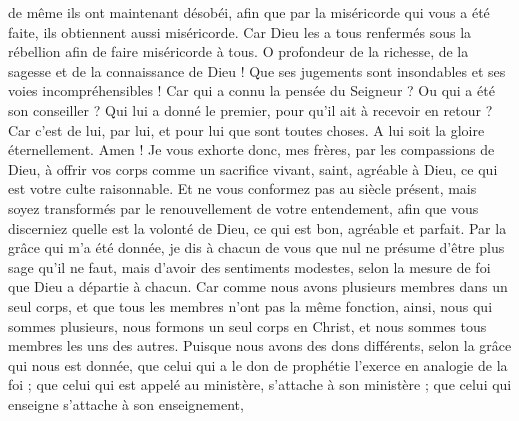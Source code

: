 \begin{multicols}{2}
de même ils ont maintenant désobéi, afin que par la miséricorde qui vous a été faite, ils obtiennent aussi miséricorde.
Car Dieu les a tous renfermés sous la rébellion afin de faire miséricorde à tous.
O profondeur de la richesse, de la sagesse et de la connaissance de Dieu ! Que ses jugements sont insondables et ses voies incompréhensibles !
Car qui a connu la pensée du Seigneur ? Ou qui a été son conseiller ?
Qui lui a donné le premier, pour qu’il ait à recevoir en retour ?
Car c’est de lui, par lui, et pour lui que sont toutes choses. A lui soit la gloire éternellement. Amen !
\VerseOne{}Je vous exhorte donc, mes frères, par les compassions de Dieu, à offrir vos corps comme un sacrifice vivant, saint, agréable à Dieu, ce qui est votre culte raisonnable.
Et ne vous conformez pas au siècle présent, mais soyez transformés par le renouvellement de votre entendement, afin que vous discerniez quelle est la volonté de Dieu, ce qui est bon, agréable et parfait.
Par la grâce qui m’a été donnée, je dis à chacun de vous que nul ne présume d'être plus sage qu'il ne faut, mais d’avoir des sentiments modestes, selon la mesure de foi que Dieu a départie à chacun.
Car comme nous avons plusieurs membres dans un seul corps, et que tous les membres n'ont pas la même fonction,
ainsi, nous qui sommes plusieurs, nous formons un seul corps en Christ, et nous sommes tous membres les uns des autres.
Puisque nous avons des dons différents, selon la grâce qui nous est donnée, que celui qui a le don de prophétie l’exerce en analogie de la foi ;
que celui qui est appelé au ministère, s’attache à son ministère ; que celui qui enseigne s’attache à son enseignement,

\end{multicols}
